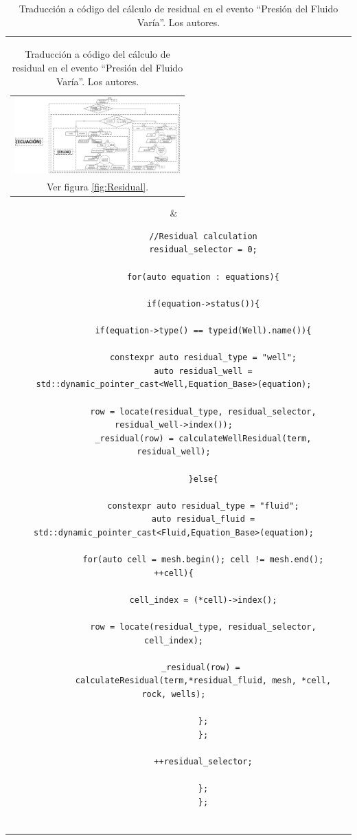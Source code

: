 \begin{table}[h]
	\centering
	\begin{tabular}{cc}
		\parbox[c]{7em}{
			\begin{tabular}[c]{@{}c@{}}\includegraphics[width=2.5in]{Fig/Residual.pdf}\\ Ver figura \ref{fig:Residual}.\end{tabular}
		}
		&
		\begin{tiny}
			\begin{lstlisting}
			//Residual calculation
			residual_selector = 0;
			
			for(auto equation : equations){
			
			if(equation->status()){
			
			if(equation->type() == typeid(Well).name()){
			
			constexpr auto residual_type = "well";
			auto residual_well = std::dynamic_pointer_cast<Well,Equation_Base>(equation);
			
			row = locate(residual_type, residual_selector, residual_well->index());
			_residual(row) = calculateWellResidual(term, residual_well);
			
			}else{
			
			constexpr auto residual_type = "fluid";
			auto residual_fluid = std::dynamic_pointer_cast<Fluid,Equation_Base>(equation);
			
			for(auto cell = mesh.begin(); cell != mesh.end(); ++cell){
			
			cell_index = (*cell)->index();
			
			row = locate(residual_type, residual_selector, cell_index);
			
			_residual(row) = 
			calculateResidual(term,*residual_fluid, mesh, *cell, rock, wells);
			
			};
			};
			
			++residual_selector;
			
			};
			};
			
			\end{lstlisting}
		\end{tiny}
	\end{tabular}
	\label{tab:ResidualCode}
	\caption[Traducción a código del cálculo de residual en el evento ``Presión del Fluido Varía''.]{Traducción a código del cálculo de residual en el evento ``Presión del Fluido Varía''. Los autores.}
\end{table}


